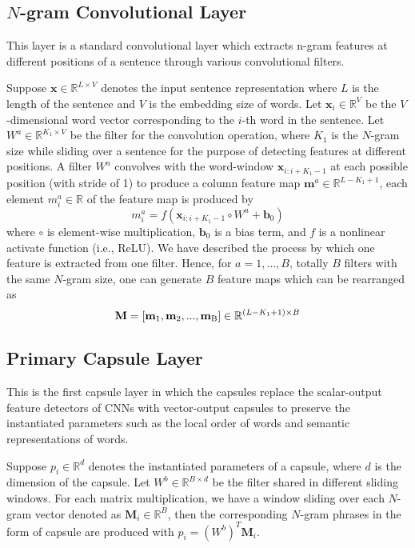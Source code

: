 \documentclass[11pt]{article}
\begin{document}
\subsection{$N$-gram Convolutional Layer}
This layer is a standard convolutional layer which extracts n-gram features at different positions of a sentence through various convolutional filters.

Suppose $\mathbf{x} \in \mathbb{R}^{L\times V}$ denotes the input sentence representation where $L$ is the length of the sentence and $V$ is the embedding size of words. Let $\mathbf{x}_{i}\in \mathbb{R}^V$ be the $V$-dimensional word vector corresponding to the $i$-th word in the sentence. Let $W^a \in \mathbb{R}^{K_{1}\times V}$ be the filter for the convolution operation, where $K_{1}$ is the $N$-gram size while sliding over a sentence for the purpose of detecting features at different positions. 
A filter $W^a$ convolves with the word-window $\mathbf{x}_{i:i+K_{1}-1}$ at each possible position (with stride of 1) to produce a column feature map $\mathbf{m}^{a} \in \mathbb{R}^{L-K_{1}+1}$, each element $m_{i}^a \in \mathbb{R}$ of the feature map is produced by
\begin{equation}
m_{i}^a=f(\mathbf x_{i:i+K_{1}-1}\circ W^a+\mathbf b_{0})
\end{equation}
where $\circ$ is element-wise multiplication, $\mathbf b_{0}$ is a bias term, and $f$ is a nonlinear activate function (i.e., ReLU). We have described the process by which one
feature is extracted from one filter. Hence, for $a=1,\ldots,B$, totally $B$
filters with the same $N$-gram size, one can generate $B$ feature maps which can be rearranged as
\begin{equation}
\mathbf{M}=[\mathbf{m}_{1},\mathbf{m}_{2},...,\mathbf{m}_{\rm{B}}]  \in \mathbb{R}^{(L-K_{1}+1)\times B}
\end{equation}






\subsection{Primary Capsule Layer}
This is the first capsule layer in which the capsules replace the scalar-output feature detectors of CNNs with vector-output capsules to preserve the instantiated parameters such as the local order of words and semantic representations of words.




Suppose $p_{i}\in \mathbb{R}^d$ denotes the instantiated parameters  of a capsule, where $d$ is the dimension of the capsule. Let $W^b \in \mathbb{R}^{B \times d}$ be the filter shared in different sliding windows. For each matrix multiplication, we have a window sliding over each $N$-gram vector denoted as $\mathbf M_{i}\in \mathbb{R}^B$, then the corresponding $N$-gram phrases in the form of capsule are produced with $p_i = (W^b)^T \mathbf M_i$. 
\end{document}
